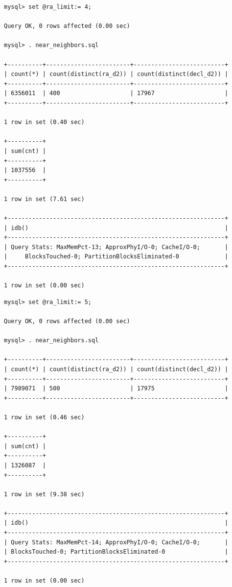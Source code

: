 \documentclass[DM,lsstdraft,toc]{lsstdoc}
\begin{document}
\begin{verbatim}
mysql> set @ra_limit:= 4;

Query OK, 0 rows affected (0.00 sec)

mysql> . near_neighbors.sql

+----------+------------------------+--------------------------+
| count(*) | count(distinct(ra_d2)) | count(distinct(decl_d2)) |
+----------+------------------------+--------------------------+
| 6356011  | 400                    | 17967                    |
+----------+------------------------+--------------------------+

1 row in set (0.40 sec)

+----------+
| sum(cnt) |
+----------+
| 1037556  |
+----------+

1 row in set (7.61 sec)

+--------------------------------------------------------------+
| idb()                                                        |
+--------------------------------------------------------------+
| Query Stats: MaxMemPct-13; ApproxPhyI/O-0; CacheI/O-0;       |
|     BlocksTouched-0; PartitionBlocksEliminated-0             |
+--------------------------------------------------------------+

1 row in set (0.00 sec)
\end{verbatim}

\begin{verbatim}
mysql> set @ra_limit:= 5;

Query OK, 0 rows affected (0.00 sec)

mysql> . near_neighbors.sql

+----------+------------------------+--------------------------+
| count(*) | count(distinct(ra_d2)) | count(distinct(decl_d2)) |
+----------+------------------------+--------------------------+
| 7989071  | 500                    | 17975                    |
+----------+------------------------+--------------------------+

1 row in set (0.46 sec)

+----------+
| sum(cnt) |
+----------+
| 1326087  |
+----------+

1 row in set (9.38 sec)

+--------------------------------------------------------------+
| idb()                                                        |
+--------------------------------------------------------------+
| Query Stats: MaxMemPct-14; ApproxPhyI/O-0; CacheI/O-0;       |
| BlocksTouched-0; PartitionBlocksEliminated-0                 |
+--------------------------------------------------------------+

1 row in set (0.00 sec)
\end{verbatim}
\end{document}
